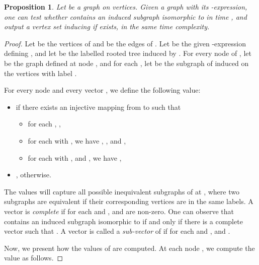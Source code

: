 \documentclass[11pt]{article}
\newtheorem{proposition}[theorem]{Proposition}
\theoremstyle{remark}
\begin{document}
\begin{proposition}\label{prop:inducedoncw}
Let  be a graph on  vertices.
Given a graph  with its -expression, 
one can test whether  contains an induced subgraph isomorphic to  in time , 
and output a vertex set inducing  if exists, in the same time complexity.
\end{proposition}
\begin{proof}
Let  be the vertices of  and  be the edges of .
Let  be the given -expression defining , and  
let  be the labelled rooted tree induced by .
For every node  of , let  be the graph defined at node , and for each , let  be the subgraph of  induced on the vertices with label .






For every node  and every vector , 
we define the following value:






\begin{itemize}
\item 
   if there exists an injective mapping  from  to  such that      
   \begin{itemize}
      \item  for each , ,
	\item for each  with , we have , , and ,
	\item for each  with ,  and , we have ,
	\end{itemize}
\item , otherwise.
\end{itemize}
The values  will capture all possible inequivalent subgraphs of  at , where two subgraphs are equivalent if their corresponding vertices are in the same labels.
A vector  is \emph{complete} if for each  and , 
 and  are non-zero. 
One can observe that  contains an induced subgraph isomorphic to  if and only if 
there is a complete vector  such that .
A vector  is called a \emph{sub-vector} of  
if for each  and ,  and .


Now, we present how the values of  are computed.
At each node , we compute the value  as follows.


\end{proof}
\end{document}
